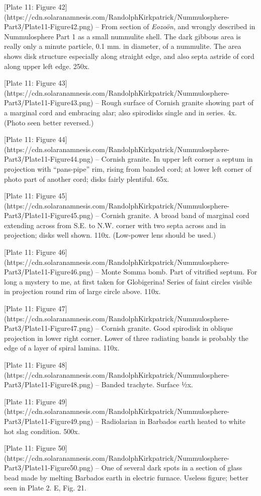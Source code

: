 \documentclass[a4paper, 12pt, oneside]{article}
\begin{document}
[Plate 11: Figure 42](https://cdn.solaranamnesis.com/RandolphKirkpatrick/Nummulosphere-Part3/Plate11-Figure42.png) -- From section of \emph{Eozoön}, and wrongly described in Nummulosphere Part 1 as a small nummulite shell. The dark gibbous area is really only a minute particle, 0.1 mm. in diameter, of a nummulite. The area shows disk structure especially along straight edge, and also septa astride of cord along upper left edge. 250x.

[Plate 11: Figure 43](https://cdn.solaranamnesis.com/RandolphKirkpatrick/Nummulosphere-Part3/Plate11-Figure43.png) -- Rough surface of Cornish granite showing part of a marginal cord and embracing alar; also spirodisks single and in series. 4x. (Photo seen better reversed.)

[Plate 11: Figure 44](https://cdn.solaranamnesis.com/RandolphKirkpatrick/Nummulosphere-Part3/Plate11-Figure44.png) -- Cornish granite. In upper left corner a septum in projection with ``pans-pipe'' rim, rising from banded cord; at lower left corner of photo part of another cord; disks fairly plentiful. 65x.

[Plate 11: Figure 45](https://cdn.solaranamnesis.com/RandolphKirkpatrick/Nummulosphere-Part3/Plate11-Figure45.png) -- Cornish granite. A broad band of marginal cord extending across from S.E. to N.W. corner with two septa across and in projection; disks well shown. 110x. (Low-power lens should be used.)

[Plate 11: Figure 46](https://cdn.solaranamnesis.com/RandolphKirkpatrick/Nummulosphere-Part3/Plate11-Figure46.png) -- Monte Somma bomb. Part of vitrified septum. For long a mystery to me, at first taken for Globigerina! Series of faint circles visible in projection round rim of large circle above. 110x.

[Plate 11: Figure 47](https://cdn.solaranamnesis.com/RandolphKirkpatrick/Nummulosphere-Part3/Plate11-Figure47.png) -- Cornish granite. Good spirodisk in oblique projection in lower right corner. Lower of three radiating bands is probably the edge of a layer of spiral lamina. 110x.

[Plate 11: Figure 48](https://cdn.solaranamnesis.com/RandolphKirkpatrick/Nummulosphere-Part3/Plate11-Figure48.png) -- Banded trachyte. Surface ½x.

[Plate 11: Figure 49](https://cdn.solaranamnesis.com/RandolphKirkpatrick/Nummulosphere-Part3/Plate11-Figure49.png) -- Radiolarian in Barbados earth heated to white hot slag condition. 500x.

[Plate 11: Figure 50](https://cdn.solaranamnesis.com/RandolphKirkpatrick/Nummulosphere-Part3/Plate11-Figure50.png) -- One of several dark spots in a section of glass bead made by melting Barbados earth in electric furnace. Useless figure; better seen in Plate 2. E, Fig. 21.
\end{document}
